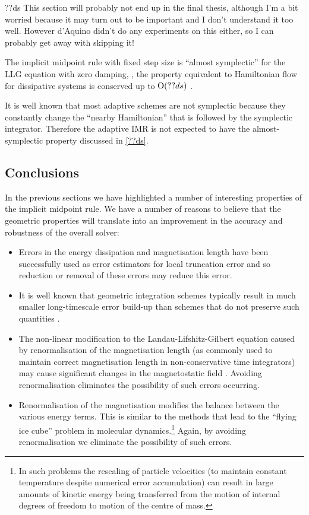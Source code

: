 ??ds This section will probably not end up in the final thesis, although I'm a bit worried because it may turn out to be important and I don't understand it too well.
However d'Aquino didn't do any experiments on this either, so I can probably get away with skipping it!

The implicit midpoint rule with fixed step size is ``almost symplectic'' for the LLG equation with zero damping, , \ie the property equivalent to Hamiltonian flow for  dissipative systems is conserved up to $\text{O}{\left( ??ds \right)}$ \cite{DAquino2005} \cite{Austin1993}.

It is well known that most adaptive schemes are not symplectic \cite[91]{Iserles2009} because they constantly change the ``nearby Hamiltonian'' that is followed by the symplectic integrator.
Therefore the adaptive IMR is not expected to have the almost-symplectic property discussed in \cref{??ds}.


\subsection{Conclusions}

In the previous sections we have highlighted a number of interesting properties of the implicit midpoint rule.
We have a number of reasons to believe that the geometric properties will translate into an improvement in the accuracy and robustness of the overall solver:
\begin{itemize}
\item Errors in the energy dissipation \cite{Albuquerque2001} and magnetisation length \cite{Chantrell2001} have been successfully used as error estimators for local truncation error and so reduction or removal of these errors may reduce this error.
\item It is well known that geometric integration schemes typically result in much smaller long-timescale error build-up than schemes that do not preserve such quantities \cite[77]{Iserles2009}.
\item The non-linear modification to the Landau-Lifshitz-Gilbert equation caused by renormalisation of the magnetisation length (as commonly used to maintain correct magnetisation length in non-conservative time integrators) may cause significant changes in the magnetostatic field \cite{Lewis2003}.
Avoiding renormalisation eliminates the possibility of such errors occurring.
\item Renormalisation of the magnetisation modifies the balance between the various energy terms.
This is similar to the methods that lead to the ``flying ice cube'' problem \cite{Harvey1998} in molecular dynamics.\footnote{In such problems the rescaling of particle velocities (to maintain constant temperature despite numerical error accumulation) can result in large amounts of kinetic energy being transferred from the motion of internal degrees of freedom to motion of the centre of mass.}
Again, by avoiding renormalisation we eliminate the possibility of such errors.
\end{itemize}

